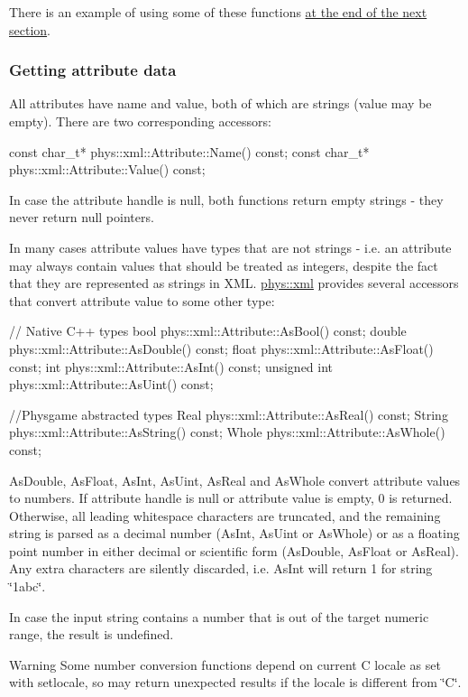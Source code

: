  \par
 There is an example of using some of these functions \hyperlink{XMLManual_XMLAccessingAttributeData}{at the end of the next section}. \hypertarget{XMLManual_XMLAccessingAttributeData}{}\subsubsection{Getting attribute data}\label{XMLManual_XMLAccessingAttributeData}
All attributes have name and value, both of which are strings (value may be empty). There are two corresponding accessors: 
\begin{DoxyCode}
 const char_t* phys::xml::Attribute::Name() const;
 const char_t* phys::xml::Attribute::Value() const;
\end{DoxyCode}
 In case the attribute handle is null, both functions return empty strings -\/ they never return null pointers. \par
 \par
 In many cases attribute values have types that are not strings -\/ i.e. an attribute may always contain values that should be treated as integers, despite the fact that they are represented as strings in XML. \hyperlink{namespacephys_1_1xml}{phys::xml} provides several accessors that convert attribute value to some other type: 
\begin{DoxyCode}
 // Native C++ types
 bool phys::xml::Attribute::AsBool() const;
 double phys::xml::Attribute::AsDouble() const;
 float phys::xml::Attribute::AsFloat() const;
 int phys::xml::Attribute::AsInt() const;
 unsigned int phys::xml::Attribute::AsUint() const;

 //Physgame abstracted types
 Real phys::xml::Attribute::AsReal() const;
 String phys::xml::Attribute::AsString() const;
 Whole phys::xml::Attribute::AsWhole() const;
\end{DoxyCode}
 AsDouble, AsFloat, AsInt, AsUint, AsReal and AsWhole convert attribute values to numbers. If attribute handle is null or attribute value is empty, 0 is returned. Otherwise, all leading whitespace characters are truncated, and the remaining string is parsed as a decimal number (AsInt, AsUint or AsWhole) or as a floating point number in either decimal or scientific form (AsDouble, AsFloat or AsReal). Any extra characters are silently discarded, i.e. AsInt will return 1 for string \char`\"{}1abc\char`\"{}. \par
 \par
 In case the input string contains a number that is out of the target numeric range, the result is undefined. \begin{DoxyWarning}{Warning}
Some number conversion functions depend on current C locale as set with setlocale, so may return unexpected results if the locale is different from \char`\"{}C\char`\"{}.
\end{DoxyWarning}
